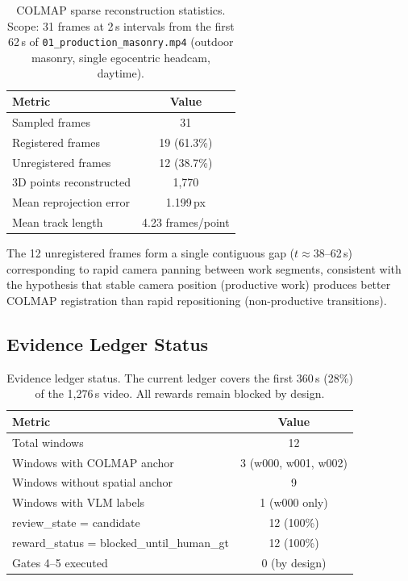 \documentclass[sigconf,nonacm]{acmart}
\begin{document}
\begin{table}[h]
\centering
\caption{COLMAP sparse reconstruction statistics.
Scope: 31 frames at 2\,s intervals from the first 62\,s of \texttt{01\_production\_masonry.mp4} (outdoor masonry, single egocentric headcam, daytime).}
\begin{tabular}{lc}
\toprule
Metric & Value \\
\midrule
Sampled frames & 31 \\
Registered frames & 19 (61.3\%) \\
Unregistered frames & 12 (38.7\%) \\
3D points reconstructed & 1,770 \\
Mean reprojection error & 1.199\,px \\
Mean track length & 4.23 frames/point \\
\bottomrule
\end{tabular}
\label{tab:colmap}
\end{table}

The 12 unregistered frames form a single contiguous gap ($t \approx 38$--62\,s) corresponding to rapid camera panning between work segments, consistent with the hypothesis that stable camera position (productive work) produces better COLMAP registration than rapid repositioning (non-productive transitions).

\subsection{Evidence Ledger Status}

\begin{table}[h]
\centering
\caption{Evidence ledger status.
The current ledger covers the first 360\,s (28\%) of the 1,276\,s video.
All rewards remain blocked by design.}
\begin{tabular}{lc}
\toprule
Metric & Value \\
\midrule
Total windows & 12 \\
Windows with COLMAP anchor & 3 (w000, w001, w002) \\
Windows without spatial anchor & 9 \\
Windows with VLM labels & 1 (w000 only) \\
review\_state = candidate & 12 (100\%) \\
reward\_status = blocked\_until\_human\_gt & 12 (100\%) \\
Gates 4--5 executed & 0 (by design) \\
\bottomrule
\end{tabular}
\label{tab:ledger}
\end{table}
\end{document}
